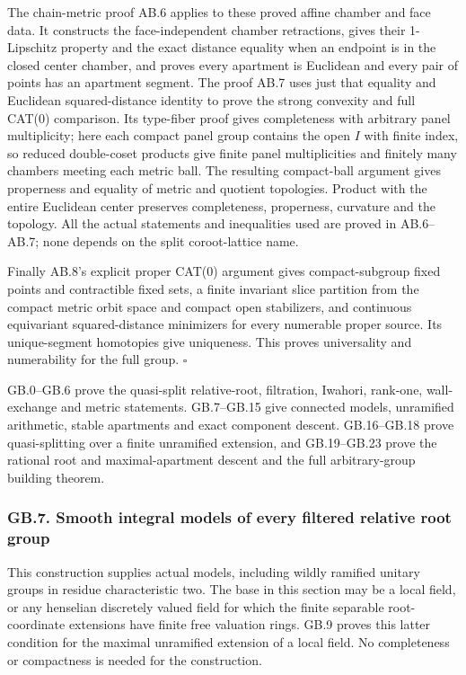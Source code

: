 \documentclass[
  11pt,
]{article}
\begin{document}
The chain-metric proof AB.6 applies to these proved affine chamber and
face data. It constructs the face-independent chamber retractions, gives
their 1-Lipschitz property and the exact distance equality when an
endpoint is in the closed center chamber, and proves every apartment is
Euclidean and every pair of points has an apartment segment. The proof
AB.7 uses just that equality and Euclidean squared-distance identity to
prove the strong convexity and full CAT(0) comparison. Its type-fiber
proof gives completeness with arbitrary panel multiplicity; here each
compact panel group contains the open \(I\) with finite index, so
reduced double-coset products give finite panel multiplicities and
finitely many chambers meeting each metric ball. The resulting
compact-ball argument gives properness and equality of metric and
quotient topologies. Product with the entire Euclidean center preserves
completeness, properness, curvature and the topology. All the actual
statements and inequalities used are proved in AB.6--AB.7; none depends
on the split coroot-lattice name.

Finally AB.8's explicit proper CAT(0) argument gives compact-subgroup
fixed points and contractible fixed sets, a finite invariant slice
partition from the compact metric orbit space and compact open
stabilizers, and continuous equivariant squared-distance minimizers for
every numerable proper source. Its unique-segment homotopies give
uniqueness. This proves universality and numerability for the full
group. \(\square\)

GB.0--GB.6 prove the quasi-split relative-root, filtration, Iwahori,
rank-one, wall-exchange and metric statements. GB.7--GB.15 give
connected models, unramified arithmetic, stable apartments and exact
component descent. GB.16--GB.18 prove quasi-splitting over a finite
unramified extension, and GB.19--GB.23 prove the rational root and
maximal-apartment descent and the full arbitrary-group building theorem.

\subsubsection{GB.7. Smooth integral models of every filtered relative
root
group}\label{gb.7.-smooth-integral-models-of-every-filtered-relative-root-group}

This construction supplies actual models, including wildly ramified
unitary groups in residue characteristic two. The base in this section
may be a local field, or any henselian discretely valued field for which
the finite separable root-coordinate extensions have finite free
valuation rings. GB.9 proves this latter condition for the maximal
unramified extension of a local field. No completeness or compactness is
needed for the construction.
\end{document}
